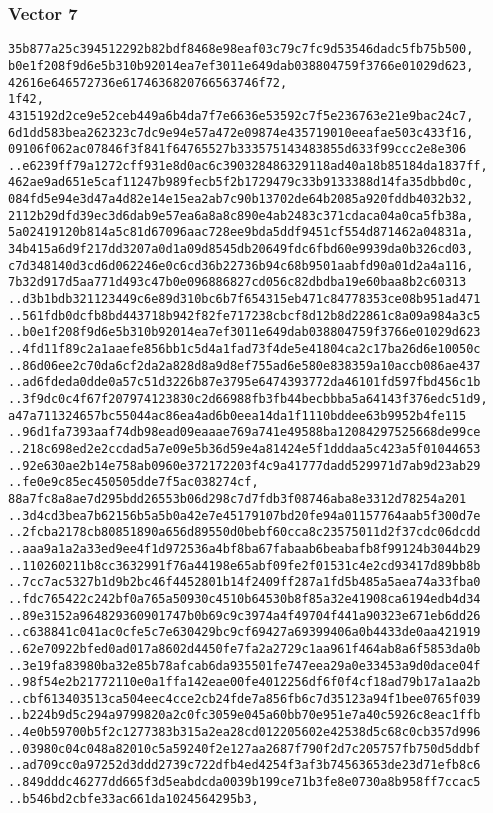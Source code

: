\documentclass[
]{article}
\begin{document}
\hypertarget{vector-7-2}{%
\subsubsection{Vector 7}\label{vector-7-2}}

\begin{verbatim}
35b877a25c394512292b82bdf8468e98eaf03c79c7fc9d53546dadc5fb75b500,
b0e1f208f9d6e5b310b92014ea7ef3011e649dab038804759f3766e01029d623,
42616e646572736e6174636820766563746f72,
1f42,
4315192d2ce9e52ceb449a6b4da7f7e6636e53592c7f5e236763e21e9bac24c7,
6d1dd583bea262323c7dc9e94e57a472e09874e435719010eeafae503c433f16,
09106f062ac07846f3f841f64765527b333575143483855d633f99ccc2e8e306
..e6239ff79a1272cff931e8d0ac6c390328486329118ad40a18b85184da1837ff,
462ae9ad651e5caf11247b989fecb5f2b1729479c33b9133388d14fa35dbbd0c,
084fd5e94e3d47a4d82e14e15ea2ab7c90b13702de64b2085a920fddb4032b32,
2112b29dfd39ec3d6dab9e57ea6a8a8c890e4ab2483c371cdaca04a0ca5fb38a,
5a02419120b814a5c81d67096aac728ee9bda5ddf9451cf554d871462a04831a,
34b415a6d9f217dd3207a0d1a09d8545db20649fdc6fbd60e9939da0b326cd03,
c7d348140d3cd6d062246e0c6cd36b22736b94c68b9501aabfd90a01d2a4a116,
7b32d917d5aa771d493c47b0e096886827cd056c82dbdba19e60baa8b2c60313
..d3b1bdb321123449c6e89d310bc6b7f654315eb471c84778353ce08b951ad471
..561fdb0dcfb8bd443718b942f82fe717238cbcf8d12b8d22861c8a09a984a3c5
..b0e1f208f9d6e5b310b92014ea7ef3011e649dab038804759f3766e01029d623
..4fd11f89c2a1aaefe856bb1c5d4a1fad73f4de5e41804ca2c17ba26d6e10050c
..86d06ee2c70da6cf2da2a828d8a9d8ef755ad6e580e838359a10accb086ae437
..ad6fdeda0dde0a57c51d3226b87e3795e6474393772da46101fd597fbd456c1b
..3f9dc0c4f67f207974123830c2d66988fb3fb44becbbba5a64143f376edc51d9,
a47a711324657bc55044ac86ea4ad6b0eea14da1f1110bddee63b9952b4fe115
..96d1fa7393aaf74db98ead09eaaae769a741e49588ba12084297525668de99ce
..218c698ed2e2ccdad5a7e09e5b36d59e4a81424e5f1dddaa5c423a5f01044653
..92e630ae2b14e758ab0960e372172203f4c9a41777dadd529971d7ab9d23ab29
..fe0e9c85ec450505dde7f5ac038274cf,
88a7fc8a8ae7d295bdd26553b06d298c7d7fdb3f08746aba8e3312d78254a201
..3d4cd3bea7b62156b5a5b0a42e7e45179107bd20fe94a01157764aab5f300d7e
..2fcba2178cb80851890a656d89550d0bebf60cca8c23575011d2f37cdc06dcdd
..aaa9a1a2a33ed9ee4f1d972536a4bf8ba67fabaab6beabafb8f99124b3044b29
..110260211b8cc3632991f76a44198e65abf09fe2f01531c4e2cd93417d89bb8b
..7cc7ac5327b1d9b2bc46f4452801b14f2409ff287a1fd5b485a5aea74a33fba0
..fdc765422c242bf0a765a50930c4510b64530b8f85a32e41908ca6194edb4d34
..89e3152a964829360901747b0b69c9c3974a4f49704f441a90323e671eb6dd26
..c638841c041ac0cfe5c7e630429bc9cf69427a69399406a0b4433de0aa421919
..62e70922bfed0ad017a8602d4450fe7fa2a2729c1aa961f464ab8a6f5853da0b
..3e19fa83980ba32e85b78afcab6da935501fe747eea29a0e33453a9d0dace04f
..98f54e2b21772110e0a1ffa142eae00fe4012256df6f0f4cf18ad79b17a1aa2b
..cbf613403513ca504eec4cce2cb24fde7a856fb6c7d35123a94f1bee0765f039
..b224b9d5c294a9799820a2c0fc3059e045a60bb70e951e7a40c5926c8eac1ffb
..4e0b59700b5f2c1277383b315a2ea28cd012205602e42538d5c68c0cb357d996
..03980c04c048a82010c5a59240f2e127aa2687f790f2d7c205757fb750d5ddbf
..ad709cc0a97252d3ddd2739c722dfb4ed4254f3af3b74563653de23d71efb8c6
..849dddc46277dd665f3d5eabdcda0039b199ce71b3fe8e0730a8b958ff7ccac5
..b546bd2cbfe33ac661da1024564295b3,
\end{verbatim}
\end{document}
